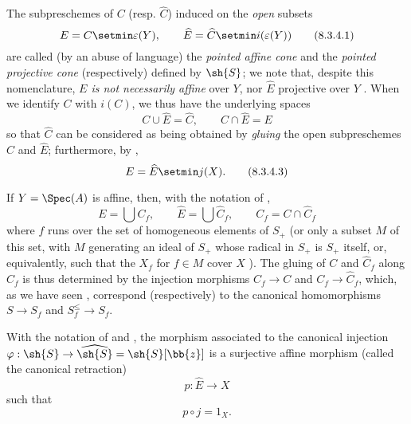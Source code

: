\begin{env}[8.3.4]
\label{II.8.3.4}
The subpreschemes of $C$ (resp. $\widehat{C}$) induced on the \emph{open} subsets
\[
\label{II.8.3.4.1}
  E = C \setmin \varepsilon(Y),
  \qquad
  \widehat{E} = \widehat{C} \setmin i(\varepsilon(Y))
\tag{8.3.4.1}
\]
are called (by an abuse of language) the \emph{pointed affine cone} and the \emph{pointed projective cone} (respectively) defined by $\sh{S}$;
we note that, despite this nomenclature, \emph{$E$ is not necessarily affine} over $Y$, nor $\widehat{E}$ projective over $Y$ .
When we identify $C$ with $i(C)$, we thus have the underlying spaces
\[
\label{II.8.3.4.2}
  C \cup \widehat{E} = \widehat{C},
  \qquad
  C \cap \widehat{E} = E
\tag{8.3.4.2}
\]
so that $\widehat{C}$ can be considered as being obtained by \emph{gluing} the open subpreschemes $C$ and $\widehat{E}$;
furthermore, by ,
\[
\label{II.8.3.4.3}
  E = \widehat{E} \setmin j(X).
\tag{8.3.4.3}
\]

If $Y=\Spec(A)$ is affine, then, with the notation of ,
\[
\label{II.8.3.4.4}
  E = \bigcup C_f,
  \qquad
  \widehat{E} = \bigcup \widehat{C}_f,
  \qquad
  C_f = C \cap \widehat{C}_f
\tag{8.3.4.4}
\]
where $f$ runs over the set of homogeneous elements of $S_+$ (or only a subset $M$ of this set, with $M$ generating an ideal of $S_+$ whose radical in $S_+$ is $S_+$ itself, or, equivalently, such that the $X_f$ for $f\in M$ cover $X$ ).
The gluing of $C$ and $\widehat{C}_f$ along $C_f$ is thus determined by the injection morphisms $C_f\to C$ and $C_f\to\widehat{C}_f$, which, as we have seen , correspond (respectively) to the canonical homomorphisms $S\to S_f$ and $S_f^\leq\to S_f$.
\end{env}

\begin{proposition}[8.3.5]
\label{II.8.3.5}
With the notation of  and , the morphism associated  to the canonical injection $\varphi:\sh{S} \to \widehat{\sh{S}} = \sh{S}[\bb{z}]$ is a surjective affine morphism (called the canonical retraction)
\[
\label{II.8.3.5.1}
  p:\widehat{E} \to X
\tag{8.3.5.1}
\]
such that
\[
\label{II.8.3.5.2}
  p \circ j = 1_X.
\tag{8.3.5.2}
\]
\end{proposition}

